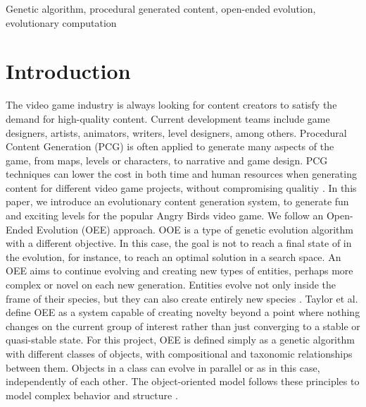 \documentclass[conference]{IEEEtran}
\begin{document}
\begin{IEEEkeywords}
Genetic algorithm, procedural generated content, open-ended evolution,
evolutionary computation
\end{IEEEkeywords}
    
\section{Introduction}
The video game industry is always looking for content creators to satisfy
the demand for high-quality content. Current development teams include game
designers,  artists, animators,  writers, level designers, among others.
Procedural Content Generation (PCG) is often applied to generate many
aspects of the game, from maps, levels or characters, to narrative and game
design. PCG techniques can lower the cost in both time and human resources
when generating content for different video game projects, without
compromising qualitiy \cite{Yannakakis2017,YannakakisContentGeneration}. In
this paper, we introduce an evolutionary content generation system, to
generate fun and exciting levels for the popular Angry Birds video game. We
follow an Open-Ended Evolution (OEE) approach.  OOE is a type of genetic
evolution algorithm with a different objective. In this case, the goal is
not to reach a final state of in the evolution, for instance, to reach an
optimal solution in a search space. An OEE aims to continue evolving and
creating new types of entities, perhaps more complex or novel on each new
generation. Entities evolve not only inside the frame of their species, but
they can also create entirely new species \cite{Standish2003}. Taylor et al.
\cite{Taylor2016, Taylor} define OEE as a system capable of creating novelty
beyond a point where nothing changes on the current group of interest rather
than just converging to a stable or quasi-stable state. For this project,
OEE is defined simply as a genetic algorithm with different classes of
objects, with compositional and taxonomic relationships between them.
Objects in a class can evolve in parallel or as in this case, independently
of each other. The object-oriented model follows these principles to model
complex behavior and structure \cite{levesque1986knowledge}. 
\end{document}
